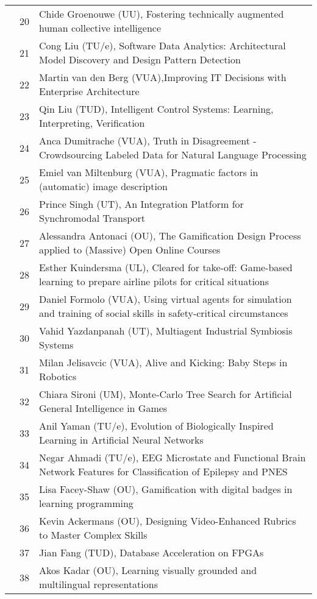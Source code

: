 \begin{xltabular}{\linewidth}{@{} l @{\hspace{0.5em}} l @{\hspace{1em}} X @{}}
	&	 20	&	 Chide Groenouwe (UU), Fostering technically augmented human collective intelligence \\
	&	 21	&	 Cong Liu (TU/e), Software Data Analytics: Architectural Model Discovery and Design Pattern Detection \\
	&	 22	&	 Martin van den Berg (VUA),Improving IT Decisions with Enterprise Architecture \\
	&	 23	&	 Qin Liu (TUD), Intelligent Control Systems: Learning, Interpreting, Verification\\
	&	 24	&	 Anca Dumitrache (VUA),  Truth in Disagreement - Crowdsourcing Labeled Data for Natural Language Processing\\
	&	 25	&	 Emiel van Miltenburg (VUA), Pragmatic factors in (automatic) image description \\
	&	 26	&	 Prince Singh (UT), An Integration Platform for Synchromodal Transport \\
	&	 27	&	 Alessandra Antonaci (OU), The Gamification Design Process applied to (Massive) Open Online Courses\\
	&	 28	&	 Esther Kuindersma (UL), Cleared for take-off: Game-based learning to prepare airline pilots for critical situations \\
	&	 29	&	 Daniel Formolo (VUA), Using virtual agents for simulation and training of social skills in safety-critical circumstances \\
	&	 30	&	 Vahid Yazdanpanah (UT), Multiagent Industrial Symbiosis Systems \\
	&	 31	&	 Milan Jelisavcic (VUA), Alive and Kicking: Baby Steps in Robotics \\
	&	 32	&	 Chiara Sironi (UM), Monte-Carlo Tree Search for Artificial General Intelligence in Games \\
	&	 33	&	 Anil Yaman (TU/e), Evolution of Biologically Inspired Learning in Artificial Neural Networks \\
	&	 34	&	 Negar Ahmadi (TU/e), EEG Microstate and Functional Brain Network Features for Classification of Epilepsy and PNES \\
	&	 35	&	 Lisa Facey-Shaw (OU), Gamification with digital badges in learning programming \\
	&	 36	&	 Kevin Ackermans (OU), Designing Video-Enhanced Rubrics to Master Complex Skills \\
	&	 37	&	 Jian Fang (TUD), Database Acceleration on FPGAs \\
	&	 38	&	 Akos Kadar (OU), Learning visually grounded and multilingual representations \\


\end{xltabular}
